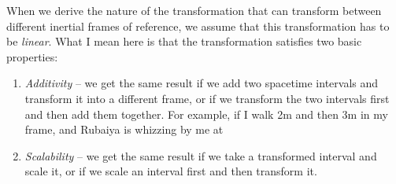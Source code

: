 \documentclass[12pt]{scrartcl}
\begin{document}
When we derive the nature of the transformation that can transform between different inertial frames of reference, we assume that this transformation has to be \textit{linear}. What I mean here is that the transformation satisfies two basic properties:
\begin{enumerate} %
	\item \textit{Additivity} -- we get the same result if we add two spacetime intervals and transform it into a different frame, or if we transform the two intervals first and then add them together. For example, if I walk 2m and then 3m in my frame, and Rubaiya is whizzing by me at %
	\item \textit{Scalability} -- we get the same result if we take a transformed interval and scale it, or if we scale an interval first and then transform it.
\end{enumerate}
\end{document}
